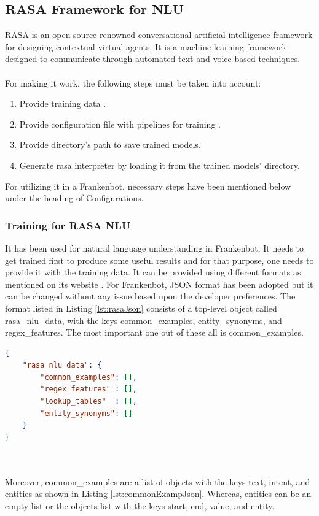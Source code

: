 \subsection{RASA Framework for NLU \label{subsec:rasanlu}}
RASA is an open-source renowned conversational artificial intelligence framework for designing contextual virtual agents. It is a machine learning framework designed to communicate through automated text and voice-based techniques. \cite{rasa}
\\~\\
For making it work, the following steps must be taken into account:
\begin{enumerate}
    \item Provide training data \cite{rasatrainingdata}.
    \item Provide configuration file with pipelines for training \cite{rasapipeline}.
    \item Provide directory's path to save trained models.
    \item Generate rasa interpreter by loading it from the trained models' directory.
\end{enumerate}
For utilizing it in a Frankenbot, necessary steps have been mentioned below under the heading of Configurations.
 
\subsubsection*{Training for RASA NLU}
It has been used for natural language understanding in Frankenbot. It needs to get trained first to produce some useful results and for that purpose, one needs to provide it with the training data. It can be provided using different formats as mentioned on its website \cite{rasatrainingdata}. For Frankenbot, JSON format has been adopted but it can be changed without any issue based upon the developer preferences. The format listed in Listing \ref{lst:rasaJson} consists of a top-level object called rasa\_nlu\_data, with the keys common\_examples, entity\_synonyms, and regex\_features. The most important one out of these all is common\_examples.

\begin{lstlisting}[language=json,firstnumber=1, caption=RASA NLU Training Data JSON Format., label={lst:rasaJson}]
{
    "rasa_nlu_data": {
        "common_examples": [],
        "regex_features" : [],
        "lookup_tables"  : [],
        "entity_synonyms": []
    }
}
\end{lstlisting}
\\~\\
Moreover, common\_examples are a list of objects with the keys text, intent, and entities as shown in Listing \ref{lst:commonExampJson}. Whereas, entities can be an empty list or the objects list with the keys start, end, value, and entity.
 
